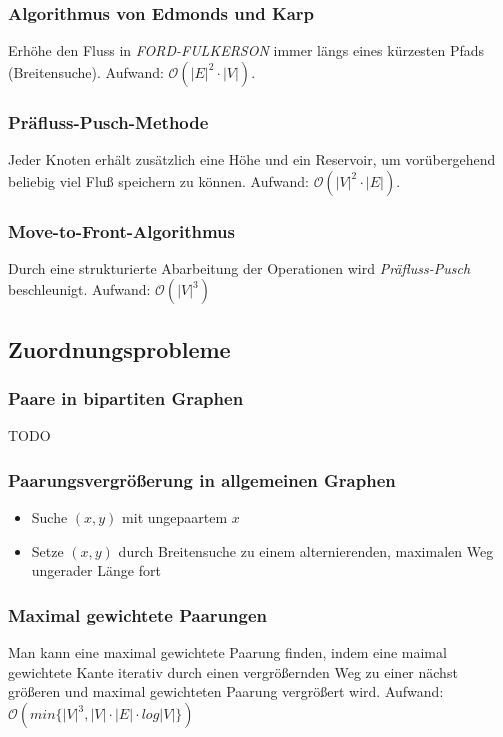 \subsubsection{Algorithmus von Edmonds und Karp}
Erhöhe den Fluss in \textit{FORD-FULKERSON} immer längs eines kürzesten Pfads (Breitensuche). Aufwand: \(\mathcal{O} (|E|^2 \cdot |V|)\).

\subsubsection{Präfluss-Pusch-Methode}
Jeder Knoten erhält zusätzlich eine Höhe und ein Reservoir, um vorübergehend beliebig viel Fluß speichern zu können. Aufwand: \(\mathcal{O} (|V|^2 \cdot |E|)\).

\subsubsection{Move-to-Front-Algorithmus}
Durch eine strukturierte Abarbeitung der Operationen wird \textit{Präfluss-Pusch} beschleunigt. Aufwand: \(\mathcal{O}(|V|^3)\)


\subsection{Zuordnungsprobleme}

\subsubsection{Paare in bipartiten Graphen}
TODO

\subsubsection{Paarungsvergrößerung in allgemeinen Graphen}
\begin{itemize}
	\item Suche \((x,y)\) mit ungepaartem \(x\)
	\item Setze \((x,y)\) durch Breitensuche zu einem alternierenden, maximalen Weg ungerader Länge fort
\end{itemize}

\subsubsection{Maximal gewichtete Paarungen}
Man kann eine maximal gewichtete Paarung finden, indem eine maimal gewichtete Kante iterativ durch einen vergrößernden Weg zu einer nächst größeren und maximal gewichteten Paarung vergrößert wird. Aufwand: \(\mathcal{O}(min\{|V|^3, |V| \cdot |E| \cdot log|V|\})\)


